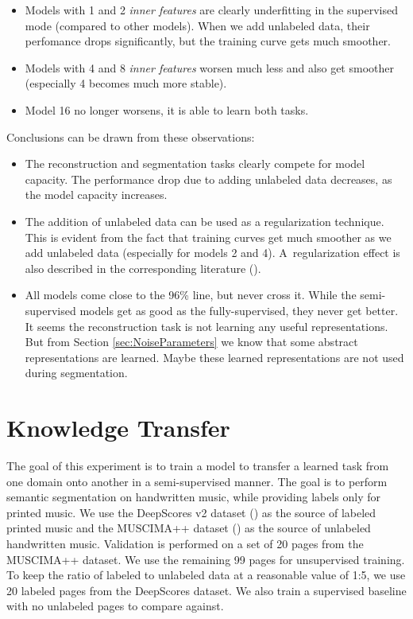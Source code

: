 \begin{itemize}
    \item Models with 1 and 2 \emph{inner features} are clearly underfitting in the supervised mode (compared to other models). When we add unlabeled data, their perfomance drops significantly, but the training curve gets much smoother.
    \item Models with 4 and 8 \emph{inner features} worsen much less and also get smoother (especially 4 becomes much more stable).
    \item Model 16 no longer worsens, it is able to learn both tasks.
\end{itemize}

Conclusions can be drawn from these observations:

\begin{itemize}
    \item The reconstruction and segmentation tasks clearly compete for model capacity. The performance drop due to adding unlabeled data decreases, as the model capacity increases.
    \item The addition of unlabeled data can be used as a regularization technique. This is evident from the fact that training curves get much smoother as we add unlabeled data (especially for models 2 and 4). A~regularization effect is also described in the corresponding literature (\cite{SemisupervisedOverview}).
    \item All models come close to the 96\% line, but never cross it. While the semi-supervised models get as good as the fully-supervised, they never get better. It seems the reconstruction task is not learning any useful representations. But from Section \ref{sec:NoiseParameters} we know that some abstract representations are learned. Maybe these learned representations are not used during segmentation.
\end{itemize}


\section{Knowledge Transfer}
\label{sec:KnowledgeTransfer}

The goal of this experiment is to train a model to transfer a learned task from one domain onto another in a semi-supervised manner. The goal is to perform semantic segmentation on handwritten music, while providing labels only for printed music. We use the DeepScores v2 dataset (\cite{DeepScores}) as the source of labeled printed music and the MUSCIMA++ dataset (\cite{MuscimaPP}) as the source of unlabeled handwritten music. Validation is performed on a set of 20 pages from the MUSCIMA++ dataset. We use the remaining 99 pages for unsupervised training. To keep the ratio of labeled to unlabeled data at a reasonable value of 1:5, we use 20 labeled pages from the DeepScores dataset. We also train a supervised baseline with no unlabeled pages to compare against.

